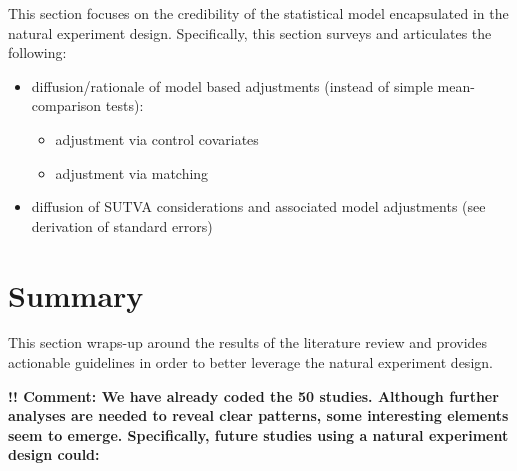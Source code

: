\documentclass[11pt, english]{article}
\begin{document}
\noindent This section focuses on the credibility of the statistical model
encapsulated in the natural experiment design. Specifically, this section surveys and articulates the following:

\begin{itemize}
    \item diffusion/rationale of model based adjustments (instead of simple
        mean-comparison tests):
        \begin{itemize}
            \item adjustment via control covariates
            \item adjustment via matching
        \end{itemize}
    \item diffusion of SUTVA considerations and associated model adjustments
        (see derivation of standard errors)
\end{itemize}


%
%
%
%
%
%
%
%
%
%
%
%

\section{Summary}

\noindent This section wraps-up around the results of the literature review and
provides actionable guidelines in order to better leverage the natural
experiment design.

\noindent \textbf{!! Comment: We have already coded the 50 studies. Although
    further analyses are needed to reveal clear patterns, some interesting
    elements seem to emerge. Specifically, future studies using a natural
    experiment design could:}
\end{document}
